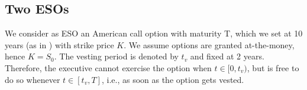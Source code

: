 \subsection{Two ESOs}
We consider as ESO an American call option with maturity T, which we set at 10 years (as in \cite{marquardt2002cost}) with strike price $K$. We assume options are granted at-the-money, hence $K=S_0$. The vesting period is denoted by $t_v$ and fixed at 2 years. %
Therefore, the executive cannot exercise the option when $t \in [0, t_v)$, but is free to do so whenever $t \in [t_v, T]$, i.e., as soon as the option gets vested. 

